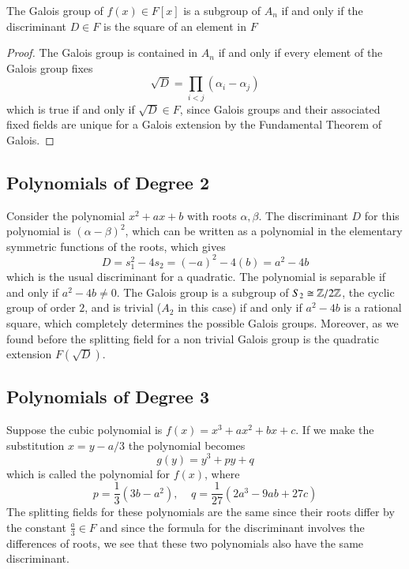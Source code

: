 \documentclass[12pt, a4paper, oneside, openright, titlepage]{book}
\begin{document}
\begin{prop}
    The Galois group of $f(x) \in F[x]$ is a subgroup of $A_n$ if and only if the discriminant $D \in F$ is the square of an element in $F$
\end{prop}
\begin{proof}
    The Galois group is contained in $A_n$ if and only if every element of the Galois group fixes \begin{equation*}
        \sqrt{D} = \prod_{i < j}(\alpha_i - \alpha_j)
    \end{equation*}
    which is true if and only if $\sqrt{D} \in F$, since Galois groups and their associated fixed fields are unique for a Galois extension by the Fundamental Theorem of Galois.
\end{proof}


\subsection{Polynomials of Degree 2}

Consider the polynomial $x^2+ax+b$ with roots $\alpha,\beta$. The discriminant $D$ for this polynomial is $(\alpha-\beta)^2$, which can be written as a polynomial in the elementary symmetric functions of the roots, which gives $$D = s_1^2-4s_2 = (-a)^2-4(b) = a^2-4b$$
which is the usual discriminant for a quadratic. The polynomial is separable if and only if $a^2-4b \neq 0$. The Galois group is a subgroup of $S_2 \cong \mathbb Z/2\mathbb Z$, the cyclic group of order $2$, and is trivial ($A_2$ in this case) if and only if $a^2-4b$ is a rational square, which completely determines the possible Galois groups. Moreover, as we found before the splitting field for a non trivial Galois group is the quadratic extension $F(\sqrt{D})$.


\subsection{Polynomials of Degree 3}

Suppose the cubic polynomial is $f(x) = x^3+ax^2+bx+c$. If we make the substitution $x = y-a/3$ the polynomial becomes \begin{equation*}
    g(y) = y^3+py+q
\end{equation*}
which is called the  polynomial for $f(x)$, where \begin{equation*}
    p = \frac{1}{3}(3b-a^2),\;\;\;\;q = \frac{1}{27}(2a^3-9ab+27c)
\end{equation*}
The splitting fields for these polynomials are the same since their roots differ by the constant $\frac{a}{3} \in F$ and since the formula for the discriminant involves the differences of roots, we see that these two polynomials also have the same discriminant.
\end{document}
